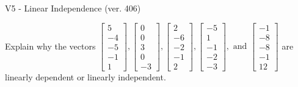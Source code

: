 \begin{exercise}
  \begin{exerciseTitle}V5 - Linear Independence (ver. 406)\end{exerciseTitle}
  \begin{exerciseStatement}
    Explain why the vectors \(\left[\begin{array}{r}
5 \\
-4 \\
-5 \\
-1 \\
1
\end{array}\right] , \left[\begin{array}{r}
0 \\
0 \\
3 \\
0 \\
-3
\end{array}\right] , \left[\begin{array}{r}
2 \\
-6 \\
-2 \\
-1 \\
2
\end{array}\right] , \left[\begin{array}{r}
-5 \\
1 \\
-1 \\
-2 \\
-3
\end{array}\right] , \text{ and } \left[\begin{array}{r}
-1 \\
-8 \\
-8 \\
-1 \\
12
\end{array}\right]\) are linearly dependent or linearly independent.	



\end{exerciseStatement}
\end{exercise}
